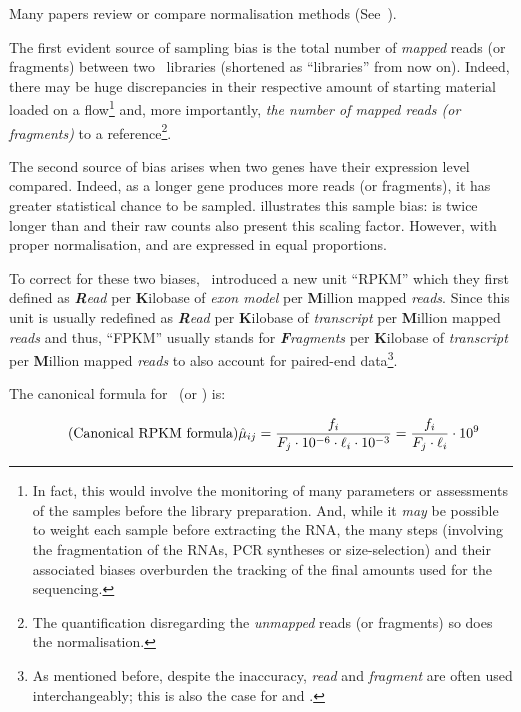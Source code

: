Many papers review or compare normalisation methods (See~).

The first evident source of sampling bias is the total number of \emph{mapped}
reads (or fragments) between two \Rnaseq\ libraries (shortened as
\enquote{libraries} from now on). Indeed, there may be huge discrepancies in
their respective amount of starting material loaded on a
\gls{flow}\footnote{In fact, this would involve the monitoring of many parameters
or assessments of the samples before the library preparation. And, while
it \emph{may} be possible to weight each sample before extracting the \gls{RNA},
the many steps (involving the fragmentation of the \glspl{RNA},
\gls{PCR} syntheses or size-selection) and their associated biases
overburden the tracking of the final amounts used for the sequencing.}
and, more importantly, \emph{the number of mapped reads (or
fragments)} to a reference\footnote{The quantification disregarding the
\emph{unmapped} reads (or fragments) so does the normalisation.}.

The second source of bias arises when two genes have their expression level
compared. Indeed, as a longer gene produces more reads (or fragments), it has
greater statistical chance to be sampled.  illustrates
this sample bias:  is twice longer than  and their
raw counts also present this scaling factor. However, with proper normalisation,
 and  are expressed in equal proportions.

To correct for these two biases,~\cite{Mortazavi2008} introduced a new unit
\enquote{RPKM} which they first defined as \emph{\textbf{R}ead} per
\textbf{K}ilobase of \emph{exon model} per \textbf{M}illion mapped \emph{reads}.
Since this unit is usually redefined as \emph{\textbf{R}ead} per
\textbf{K}ilobase of \emph{transcript} per \textbf{M}illion mapped \emph{reads}
and thus, \enquote{FPKM} usually stands for  \emph{\textbf{F}ragments} per
\textbf{K}ilobase of \emph{transcript} per \textbf{M}illion mapped \emph{reads}
to also account for paired-end data\footnote{As mentioned before,
despite the inaccuracy, \emph{read} and \emph{fragment} are often used
interchangeably; this is also the case for \emph{\RPKM} and \emph{\FPKM}.}.

The canonical formula for \FPKM\ (or \RPKM) is:

\begin{equation}
    \tag{Canonical RPKM formula}\label{eq:rpkm-fx}
\hat{\mu}_{ij}=\frac{f_i}{F_j\cdot10^{-6} \cdot \ell_i\cdot10^{-3}}
              =\frac{f_i}{F_j\cdot\ell_i}\cdot10^{9} \text{\,}
\end{equation}

